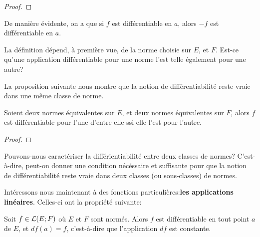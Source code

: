 \ifdefined\outputproof
\begin{proof}

\end{proof}
\fi

De manière évidente, on a que si $f$ est différentiable en $a$, alors $-f$ est
différentiable en $a$.

La définition dépend, à première vue, de la norme choisie sur $E$, et $F$. Est-ce
qu'une application différentiable pour une norme l'est telle également pour une
autre?

La proposition suivante nous montre que la notion de différentiabilité reste
vraie dans une même classe de norme.

\begin{proposition}
	Soient deux normes équivalentes sur $E$, et deux normes équivalentes sur
	$F$, alors $f$ est différentiable pour l'une d'entre elle ssi elle l'est
	pour l'autre.
\end{proposition}

\ifdefined\outputproof
\begin{proof}

\end{proof}
\fi

\begin{question}
	Pouvons-nous caractériser la différientiabilité entre deux classes de
	normes? C'est-à-dire, peut-on donner une condition nécéssaire et suffisante
	pour que la notion de différentiabilité reste vraie dans deux classes (ou
	sous-classes) de normes.
\end{question}



Intéressons nous maintenant à des fonctions particulières:\textbf{les applications
linéaires}.
Celles-ci ont la propriété suivante:

\begin{proposition}
	Soit $f \in \mathcal{L}(E; F)$ où $E$ et $F$ sont normés. Alors $f$ est
	différentiable en tout point $a$ de $E$, et $df(a) = f$, c'est-à-dire que
	l'application $df$ est constante.
\end{proposition}


